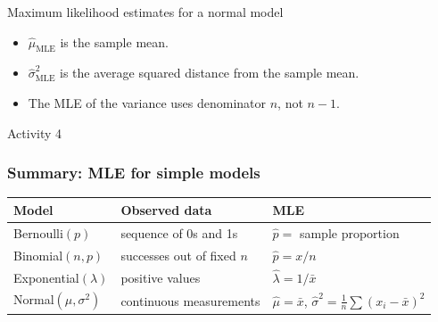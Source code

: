 \documentclass[slidestop,compress,mathserif]{beamer}
\begin{document}
\begin{frame}{Maximum likelihood estimates for a normal model}
\begin{itemize}
\item \(\widehat{\mu}_{\mathrm{MLE}}\) is the sample mean.
\item \(\widehat{\sigma}^{2}_{\mathrm{MLE}}\) is the average squared distance from the sample mean.
\item The MLE of the variance uses denominator \(n\), not \(n-1\).
\end{itemize}
\end{frame}

\begin{frame}{Activity 4}
\end{frame}

\begin{frame}
\frametitle{Summary: MLE for simple models}

\begin{center}
\small
\begin{tabular}{p{}p{}p{}}
\hline
\textbf{Model} & \textbf{Observed data} & \textbf{MLE}\\
\hline
Bernoulli\((p)\) & sequence of 0s and 1s & \(\hat p=\) sample proportion\\[0.3em]
Binomial\((n,p)\) & successes out of fixed \(n\) & \(\hat p=x/n\)\\[0.3em]
Exponential\((\lambda)\) & positive values & \(\hat\lambda=1/\bar{x}\)\\[0.3em]
Normal\((\mu,\sigma^2)\) & continuous measurements & \(\hat\mu=\bar{x}\), \(\hat\sigma^2=\frac{1}{n}\sum(x_i-\bar{x})^2\)\\
\hline
\end{tabular}
\end{center}
\end{frame}
\end{document}
